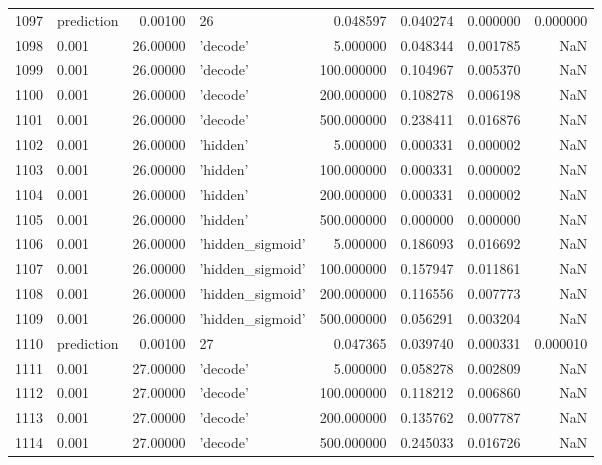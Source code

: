 \documentclass[10pt,a4paper]{article}
\begin{document}
\begin{tabular}{llrlrrrr}
1097 &  prediction &   0.00100 &                 26 &    0.048597 &  0.040274 &  0.000000 &  0.000000 \\
1098 &       0.001 &  26.00000 &           'decode' &    5.000000 &  0.048344 &  0.001785 &       NaN \\
1099 &       0.001 &  26.00000 &           'decode' &  100.000000 &  0.104967 &  0.005370 &       NaN \\
1100 &       0.001 &  26.00000 &           'decode' &  200.000000 &  0.108278 &  0.006198 &       NaN \\
1101 &       0.001 &  26.00000 &           'decode' &  500.000000 &  0.238411 &  0.016876 &       NaN \\
1102 &       0.001 &  26.00000 &           'hidden' &    5.000000 &  0.000331 &  0.000002 &       NaN \\
1103 &       0.001 &  26.00000 &           'hidden' &  100.000000 &  0.000331 &  0.000002 &       NaN \\
1104 &       0.001 &  26.00000 &           'hidden' &  200.000000 &  0.000331 &  0.000002 &       NaN \\
1105 &       0.001 &  26.00000 &           'hidden' &  500.000000 &  0.000000 &  0.000000 &       NaN \\
1106 &       0.001 &  26.00000 &   'hidden\_sigmoid' &    5.000000 &  0.186093 &  0.016692 &       NaN \\
1107 &       0.001 &  26.00000 &   'hidden\_sigmoid' &  100.000000 &  0.157947 &  0.011861 &       NaN \\
1108 &       0.001 &  26.00000 &   'hidden\_sigmoid' &  200.000000 &  0.116556 &  0.007773 &       NaN \\
1109 &       0.001 &  26.00000 &   'hidden\_sigmoid' &  500.000000 &  0.056291 &  0.003204 &       NaN \\
1110 &  prediction &   0.00100 &                 27 &    0.047365 &  0.039740 &  0.000331 &  0.000010 \\
1111 &       0.001 &  27.00000 &           'decode' &    5.000000 &  0.058278 &  0.002809 &       NaN \\
1112 &       0.001 &  27.00000 &           'decode' &  100.000000 &  0.118212 &  0.006860 &       NaN \\
1113 &       0.001 &  27.00000 &           'decode' &  200.000000 &  0.135762 &  0.007787 &       NaN \\
1114 &       0.001 &  27.00000 &           'decode' &  500.000000 &  0.245033 &  0.016726 &       NaN \\

\end{tabular}
\end{document}
